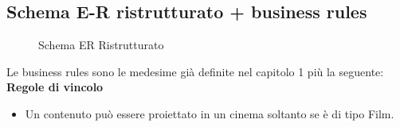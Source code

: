 \documentclass[a4paper]{article}
\begin{document}
\subsection{Schema E-R ristrutturato + business rules}
\begin{center}
\begin{figure}[h]
  \caption{Schema ER Ristrutturato}
  \end{figure}
\end{center}

Le business rules sono le medesime già definite nel capitolo 1 più la seguente:\\
{\large \textbf{Regole di vincolo}}
\begin{itemize}
  \item Un contenuto può essere proiettato in un cinema soltanto se è di tipo Film.\\
\end{itemize}
\end{document}

